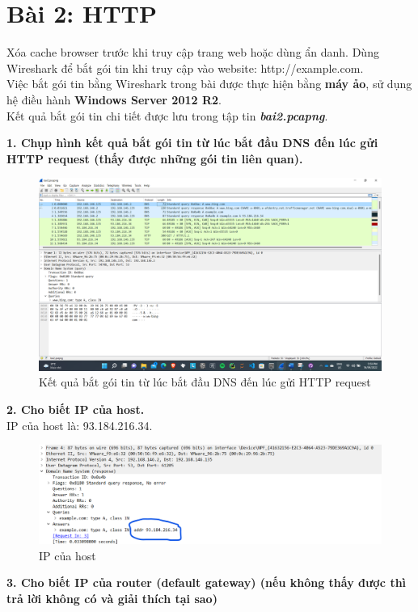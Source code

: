 \section{Bài 2: HTTP}
Xóa cache browser trước khi truy cập trang web hoặc dùng ẩn danh. Dùng Wireshark để bắt gói tin khi truy cập vào website: http://example.com.\\
Việc bắt gói tin bằng Wireshark trong bài được thực hiện bằng \textbf{máy ảo}, sử dụng hệ điều hành \textbf{Windows Server 2012 R2}.\\
Kết quả bắt gói tin chi tiết được lưu trong tập tin \textbf{\textit{bai2.pcapng}}.

\textbf{1. Chụp hình kết quả bắt gói tin từ lúc bắt đầu DNS đến lúc gửi HTTP request (thấy được những gói tin liên quan).}
\begin{figure}[H]
\begin{center}
\includegraphics[scale=.45]{../figures/p2/p2_intro}
\end{center}
\caption{Kết quả bắt gói tin từ lúc bắt đầu DNS đến lúc gửi HTTP request}
\end{figure}

\textbf{2.	Cho biết IP của host.}\\
IP của host là: 93.184.216.34.
\begin{figure}[H]
\begin{center}
\includegraphics[scale=.6]{../figures/p2/p2_hostip}
\end{center}
\caption{IP của host}
\end{figure}

\textbf{3. Cho biết IP của router (default gateway) (nếu không thấy được thì trả lời không có và giải thích tại sao)}